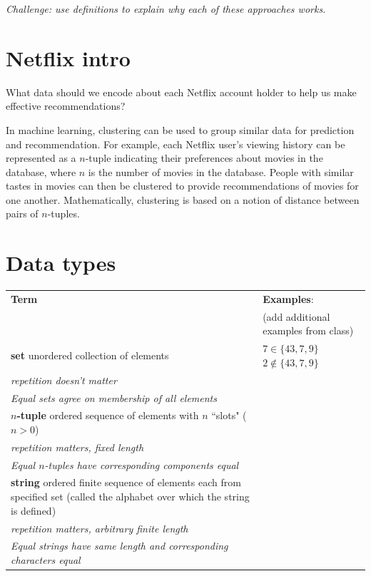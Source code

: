 \documentclass[12pt, oneside]{article}
\begin{document}
{\it Challenge: use definitions to explain why
each of these approaches works.} \vfill
\section*{Netflix intro}


What data should we encode about each Netflix account holder to help us make effective recommendations?

\vfill
\vfill

In machine learning, clustering can be used to group similar data for prediction and recommendation.  For example,
each Netflix user's viewing history can be represented as a $n$-tuple indicating their preferences about
movies in the database, where $n$ is the number of movies in the database.  People with similar tastes in movies can then be clustered to provide recommendations
of movies for one another.  Mathematically, clustering is based on a notion of distance between pairs of $n$-tuples.
 \vfill
\section*{Data types}


\begin{center}
    \begin{tabular}{|p{4.6in}p{2.6in}|}
    \hline
    {\bf  Term} & {\bf Examples}:\\
    &  (add additional examples from class)\\
    \hline 
    {\bf set} \newline
    unordered collection of elements & $7 \in \{43, 7, 9 \}$ \qquad $2 \notin \{43, 7, 9 \}$ \\
    {\it repetition doesn't matter} & \\
    {\it Equal sets agree on membership of all elements}& \\
    \hline
    {\bf $n$-tuple} \newline
    ordered sequence of elements with $n$ ``slots" ($n >0$) & \\
    {\it repetition matters, fixed length} &\\
    {\it Equal $n$-tuples have corresponding components equal}& \\
    \hline
    {\bf string} \newline
    ordered finite sequence of elements each from specified
    set (called the alphabet over which the string is defined)& \\
    {\it repetition matters, arbitrary finite length} &\\
    {\it Equal strings have same length and corresponding characters equal}\\
    \hline
    \end{tabular}
\end{center}
\end{document}
